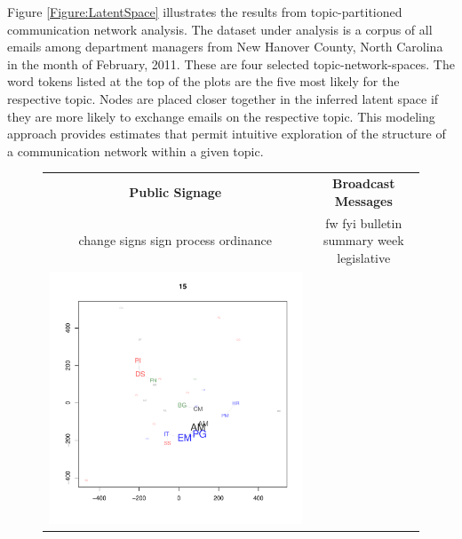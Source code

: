 Figure \ref{Figure:LatentSpace} illustrates the results from topic-partitioned communication network analysis. The dataset under analysis is a corpus of all emails among department managers from New Hanover County, North Carolina in the month of February, 2011. These are four selected topic-network-spaces. The word tokens listed at the top of the plots are the five most likely for the respective topic. Nodes are placed closer together in the inferred latent space if they are more likely to exchange emails on the respective topic. This modeling approach provides estimates that permit intuitive exploration of the structure of a communication network within a given topic.

\begin{figure}[t]
\begin{minipage}[b]{0.5\linewidth}
\centering
\begin{tabular}{cc}
{\bf Public Signage} &
{\bf Broadcast Messages}\\
{\small change signs sign process ordinance}  &
{\small fw fyi bulletin summary week legislative} \\
\includegraphics[scale=.29, trim=.4in .6in .4in .8in, clip=true]{latent_space_15} &

\end{tabular}
\end{minipage}
\end{figure}
